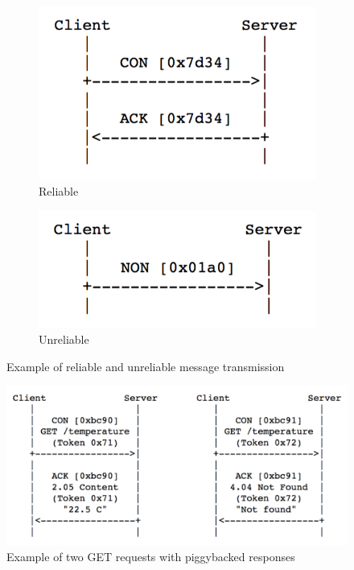 \begin{figure}[!htbp]
\begin{subfigure}[t]{.5\textwidth}
  \centering
  \includegraphics[scale = 0.55]{reliable_msg_trans.png}
  \caption{Reliable}
  \label{fig:reliable_msg_trans}
\end{subfigure}%
\begin{subfigure}[t]{.5\textwidth}
  \centering
  \includegraphics[scale = 0.55]{unreliable_msg_trans.png}
  \caption{Unreliable}
  \label{fig:unreliable_msg_trans}
\end{subfigure}
\caption{Example of reliable and unreliable message transmission \autocite{coap_protocol}}
\end{figure}

\begin{figure}[!htbp]
\centering
\includegraphics[scale = 0.55]{get_example.png}
\caption{Example of two GET requests with piggybacked responses \autocite{coap_protocol}}
\label{fig:get_example}
\end{figure}

